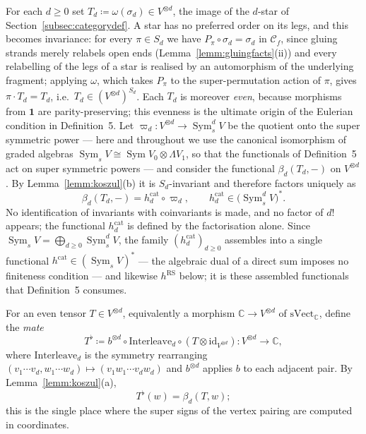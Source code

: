 \documentclass[11pt]{article}
\newcommand{\conncat}{\mathcal{C}_{f}}            %
\newcommand{\unitobj}{\mathbf{1}}                 %
\newcommand{\fib}{\omega}                         %
\newcommand{\svect}{\mathrm{sVect}_{\mathbb{C}}}
\newcommand{\mate}[1]{#1^{\flat}}                 %
\newcommand{\symq}[1]{\varpi_{#1}}                %
\newcommand{\SymV}{\operatorname{Sym}}
\begin{document}
For each $d\ge0$ set
$T_{d}\coloneqq\fib(\sigma_{d})\in V^{\otimes d}$, the
image of the $d$-star of Section~\ref{subsec:categorydef}. A star
has no preferred order on its legs, and this becomes invariance:
for every $\pi\in S_{d}$ we have $P_{\pi}\circ\sigma_{d}
=\sigma_{d}$ in $\conncat$, since gluing strands merely relabels
open ends (Lemma~\ref{lemm:gluingfacts}(ii)) and every
relabelling of the legs of a star is realised by an automorphism
of the underlying fragment; applying $\fib$, which takes
$P_{\pi}$ to the super-permutation action of $\pi$, gives
$\pi\cdot T_{d}=T_{d}$, i.e.\
$T_{d}\in(V^{\otimes d})^{S_{d}}$. Each
$T_{d}$ is moreover \emph{even}, because morphisms from $\unitobj$ are
parity-preserving; this evenness is the ultimate origin of the
Eulerian condition in Definition~5. Let
$\symq{d}\colon V^{\otimes d}\to\SymV_{s}^{d}V$ be the quotient
onto the super symmetric power --- here and throughout we use the
canonical isomorphism of graded algebras
$\SymV_{s}V\cong\SymV V_{0}\otimes\Lambda V_{1}$, so that the
functionals of Definition~5 act on super symmetric powers --- and
consider the functional $\beta_{d}(T_{d},-)$ on $V^{\otimes d}$.
By Lemma~\ref{lemm:koszul}(b) it is $S_{d}$-invariant and
therefore factors uniquely as
\[
\beta_{d}(T_{d},-)=h^{\mathrm{cat}}_{d}\circ\symq{d},
\qquad
h^{\mathrm{cat}}_{d}\in\bigl(\SymV_{s}^{d}V\bigr)^{*}.
\]
No identification of
invariants with coinvariants is made, and no factor of $d!$
appears; the functional $h^{\mathrm{cat}}_{d}$ is defined by the
factorisation alone. Since
$\SymV_{s}V=\bigoplus_{d\ge0}\SymV_{s}^{d}V$, the family
$(h^{\mathrm{cat}}_{d})_{d\ge0}$ assembles into a single
functional $h^{\mathrm{cat}}\in(\SymV_{s}V)^{*}$ --- the algebraic
dual of a direct sum imposes no finiteness condition --- and
likewise $h^{\mathrm{RS}}$ below; it is these assembled
functionals that Definition~5 consumes.

For an even tensor $T\in V^{\otimes d}$, equivalently a morphism
$\mathbb{C}\to V^{\otimes d}$ of $\svect$, define the \emph{mate}
\[
\mate{T}\coloneqq b^{\otimes d}\circ\mathrm{Interleave}_{d}\circ
(T\otimes\mathrm{id}_{V^{\otimes d}})
\colon V^{\otimes d}\to\mathbb{C},
\]
where $\mathrm{Interleave}_{d}$ is the symmetry rearranging
$(v_{1}\dotsm v_{d},w_{1}\dotsm w_{d})\mapsto
(v_{1}w_{1}\dotsm v_{d}w_{d})$ and $b^{\otimes d}$ applies $b$ to
each adjacent pair. By Lemma~\ref{lemm:koszul}(a),
\begin{equation}\label{eq:matecoords}
\mate{T}(w)=\beta_{d}(T,w);
\end{equation}
this is the single place where the super signs of the vertex
pairing are computed in coordinates.
\end{document}
